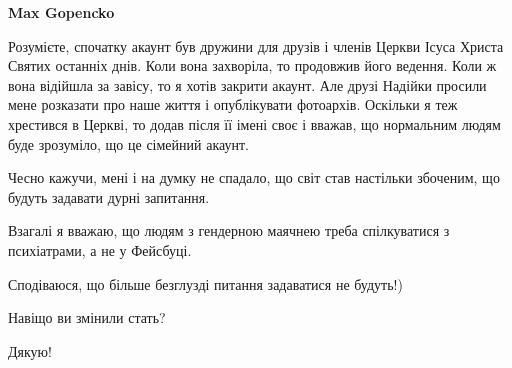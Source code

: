 \begin{itemize}
\begin{itemize}
\textbf{Max Gopencko} 

Розумієте, спочатку акаунт був дружини для друзів і членів Церкви Ісуса Христа
Святих останніх днів. Коли вона захворіла, то продовжив його ведення. Коли ж
вона відійшла за завісу, то я хотів закрити акаунт. Але друзі Надійки просили
мене розказати про наше життя і опублікувати фотоархів. Оскільки я теж
хрестився в Церкві, то додав після її імені своє і вважав, що нормальним людям
буде зрозуміло, що це сімейний акаунт.

Чесно кажучи, мені і на думку не спадало, що світ став настільки збоченим, що
будуть задавати дурні запитання.

Взагалі я вважаю, що людям з гендерною маячнею треба спілкуватися з
психіатрами, а не у Фейсбуці.

\end{itemize} %


Сподіваюся, що більше безглузді питання задаватися не будуть!)

Навіщо ви змінили стать?

Дякую!

\end{itemize} %
